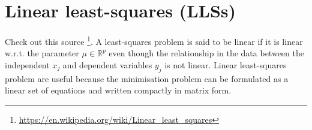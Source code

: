 \documentclass[../main.tex]{subfiles}
\begin{document}
\section{Linear least-squares (LLSs)}\label{sec:lin_least_squares}
Check out this source \footnote{\url{https://en.wikipedia.org/wiki/Linear_least_squares}}.
A least-squares problem is said to be linear if it is linear w.r.t. the parameter $\mu\in \mathbb{R}^{p}$ even though the relationship in the data between the independent $x_{j}$ and dependent variables $y_{j}$ is not linear.
Linear least-squares problem are useful because the minimisation problem can be formulated as a linear set of equations and written compactly in matrix form.


\end{document}
